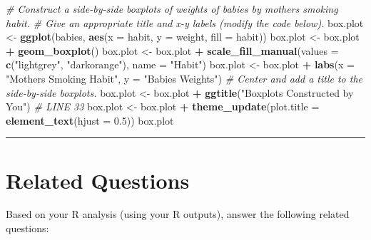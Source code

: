 \documentclass[oneside,openany]{book}
\newenvironment{Shaded}{\begin{snugshade}}{\end{snugshade}}
\newcommand{\AttributeTok}[1]{\textcolor[rgb]{0.13,0.29,0.53}{#1}}
\newcommand{\CommentTok}[1]{\textcolor[rgb]{0.56,0.35,0.01}{\textit{#1}}}
\newcommand{\FloatTok}[1]{\textcolor[rgb]{0.00,0.00,0.81}{#1}}
\newcommand{\FunctionTok}[1]{\textcolor[rgb]{0.13,0.29,0.53}{\textbf{#1}}}
\newcommand{\NormalTok}[1]{#1}
\newcommand{\OtherTok}[1]{\textcolor[rgb]{0.56,0.35,0.01}{#1}}
\newcommand{\SpecialCharTok}[1]{\textcolor[rgb]{0.81,0.36,0.00}{\textbf{#1}}}
\newcommand{\StringTok}[1]{\textcolor[rgb]{0.31,0.60,0.02}{#1}}
\begin{document}
\begin{enumerate}
\begin{Shaded}
\begin{Highlighting}[]
\CommentTok{\# Construct a side{-}by{-}side boxplots of weights of babies by mothers\textquotesingle{} smoking habit.}
\CommentTok{\# Give an appropriate title and x{-}y labels (modify the code below).}
\NormalTok{box.plot }\OtherTok{\textless{}{-}} \FunctionTok{ggplot}\NormalTok{(babies, }\FunctionTok{aes}\NormalTok{(}\AttributeTok{x =}\NormalTok{ habit, }\AttributeTok{y =}\NormalTok{ weight, }\AttributeTok{fill =}\NormalTok{ habit)) }
\NormalTok{box.plot }\OtherTok{\textless{}{-}}\NormalTok{ box.plot }\SpecialCharTok{+} \FunctionTok{geom\_boxplot}\NormalTok{()}
\NormalTok{box.plot }\OtherTok{\textless{}{-}}\NormalTok{ box.plot }\SpecialCharTok{+} \FunctionTok{scale\_fill\_manual}\NormalTok{(}\AttributeTok{values =} \FunctionTok{c}\NormalTok{(}\StringTok{"lightgrey"}\NormalTok{, }\StringTok{"darkorange"}\NormalTok{), }
                                         \AttributeTok{name =} \StringTok{"Habit"}\NormalTok{)}
\NormalTok{box.plot }\OtherTok{\textless{}{-}}\NormalTok{ box.plot }\SpecialCharTok{+} \FunctionTok{labs}\NormalTok{(}\AttributeTok{x =} \StringTok{"Mothers\textquotesingle{} Smoking Habit"}\NormalTok{, }
                            \AttributeTok{y =} \StringTok{"Babies\textquotesingle{} Weights"}\NormalTok{)}
\CommentTok{\# Center and add a title to the side{-}by{-}side boxplots.}
\NormalTok{box.plot }\OtherTok{\textless{}{-}}\NormalTok{ box.plot }\SpecialCharTok{+} \FunctionTok{ggtitle}\NormalTok{(}\StringTok{"Boxplots Constructed by You"}\NormalTok{) }\CommentTok{\# LINE 33}
\NormalTok{box.plot }\OtherTok{\textless{}{-}}\NormalTok{ box.plot }\SpecialCharTok{+} \FunctionTok{theme\_update}\NormalTok{(}\AttributeTok{plot.title =} \FunctionTok{element\_text}\NormalTok{(}\AttributeTok{hjust =} \FloatTok{0.5}\NormalTok{))}
\NormalTok{box.plot}
\end{Highlighting}
\end{Shaded}
\end{enumerate}

\begin{center}\rule{0.5\linewidth}{0.5pt}\end{center}

\section{Related Questions}\label{related-questions-7}

Based on your R analysis (using your R outputs), answer the following related questions:
\end{document}
